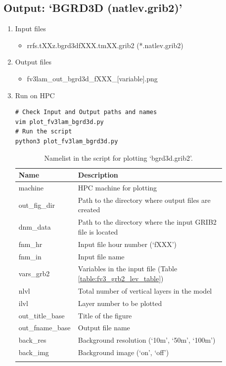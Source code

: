 \documentclass[11pt,fleqn]{report}              %
\begin{document}
\subsection{Output: `BGRD3D (natlev.grib2)'}
\label{subsec:python_BGRD3D}

\begin{enumerate}
\item Input files
\begin{itemize}
\item rrfs.tXXz.bgrd3dfXXX.tmXX.grib2 (*.natlev.grib2)
\end{itemize}
\item Output files
\begin{itemize}
\item fv3lam\_out\_bgrd3d\_fXXX\_[variable].png
\end{itemize}
\item Run on HPC

\lstset{language=bash}   
\begin{lstlisting}[frame=trBL]
# Check Input and Output paths and names
vim plot_fv3lam_bgrd3d.py
# Run the script
python3 plot_fv3lam_bgrd3d.py
\end{lstlisting}

{
\fontsize{10}{12}\selectfont
\begin{longtable}{ p{0.17\linewidth} | p{0.7\linewidth} }
\hline
\hline
 Name & Description \\
\hline
 machine & HPC machine for plotting \\
 out\_fig\_dir & Path to the directory where output files are created \\
 dnm\_data & Path to the directory where the input GRIB2 file is located   \\
 fnm\_hr & Input file hour number (`fXXX') \\
 fnm\_in & Input file name \\
 vars\_grb2 & Variables in the input file (Table \ref{table:fv3_grb2_lev_table})\\
 nlvl & Total number of vertical layers in the model \\
 ilvl & Layer number to be plotted \\
 out\_title\_base & Title of the figure \\
 out\_fname\_base & Output file name \\
 back\_res & Background resolution (`10m', `50m', `100m') \\
 back\_img & Background image (`on', `off') \\
\hline
\caption{Namelist in the script for plotting `bgrd3d.grib2'.}
\label{table:fv3_var_lev_grib2}
\end{longtable}
}


\end{enumerate}
\end{document}
